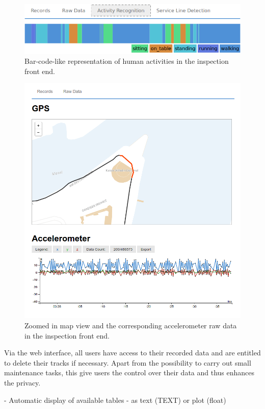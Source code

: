 \documentclass[times, 10pt,twocolumn]{article}
\begin{document}
\begin{figure}[h]
\includegraphics[width=\linewidth]{img/BarcodeScreenshot.png}
\caption{Bar-code-like representation of human activities in the inspection front end.}
\label{fig:inspectionBarcode}
\end{figure}
\begin{figure}[h]
\includegraphics[width=\linewidth]{img/InspectionTool_RAW.png}
\caption{Zoomed in map view and the corresponding accelerometer raw data in the inspection front end.}
\label{fig:inspectionRawData}
\end{figure}

Via the web interface, all users have access to their recorded data and are entitled to delete their tracks if necessary.
Apart from the possibility to carry out small maintenance tasks, this give users the control over their data and thus enhances the privacy.

  - Automatic display of available tables
    - as text (TEXT) or plot (float)
\end{document}

